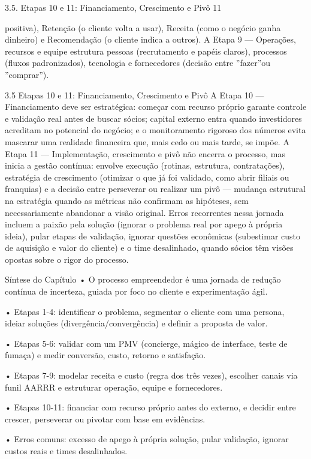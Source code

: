 3.5. Etapas 10 e 11: Financiamento, Crescimento e Pivô 11

positiva), Retenção (o cliente volta a usar), Receita (como o negócio ganha dinheiro) e Recomendação (o cliente indica a outros). A Etapa 9 — Operações, recursos e equipe estrutura pessoas (recrutamento e papéis claros), processos (fluxos padronizados), tecnologia e fornecedores (decisão entre ”fazer”ou ”comprar”).

3.5 Etapas 10 e 11: Financiamento, Crescimento e Pivô A Etapa 10 — Financiamento deve ser estratégica: começar com recurso próprio garante controle e validação real antes de buscar sócios; capital externo entra quando investidores acreditam no potencial do negócio; e o monitoramento rigoroso dos números evita mascarar uma realidade financeira que, mais cedo ou mais tarde, se impõe. A Etapa 11 — Implementação, crescimento e pivô não encerra o processo, mas inicia a gestão contínua: envolve execução (rotinas, estrutura, contratações), estratégia de crescimento (otimizar o que já foi validado, como abrir filiais ou franquias) e a decisão entre perseverar ou realizar um pivô — mudança estrutural na estratégia quando as métricas não confirmam as hipóteses, sem necessariamente abandonar a visão original. Erros recorrentes nessa jornada incluem a paixão pela solução (ignorar o problema real por apego à própria ideia), pular etapas de validação, ignorar questões econômicas (subestimar custo de aquisição e valor do cliente) e o time desalinhado, quando sócios têm visões opostas sobre o rigor do processo.

Síntese do Capítulo • O processo empreendedor é uma jornada de redução contínua de incerteza, guiada por foco no cliente e experimentação ágil.

• Etapas 1-4: identificar o problema, segmentar o cliente com uma persona, ideiar soluções (divergência/convergência) e definir a proposta de valor.

• Etapas 5-6: validar com um PMV (concierge, mágico de interface, teste de fumaça) e medir conversão, custo, retorno e satisfação.

• Etapas 7-9: modelar receita e custo (regra dos três vezes), escolher canais via funil AARRR e estruturar operação, equipe e fornecedores.

• Etapas 10-11: financiar com recurso próprio antes do externo, e decidir entre crescer, perseverar ou pivotar com base em evidências.

• Erros comuns: excesso de apego à própria solução, pular validação, ignorar custos reais e times desalinhados.

